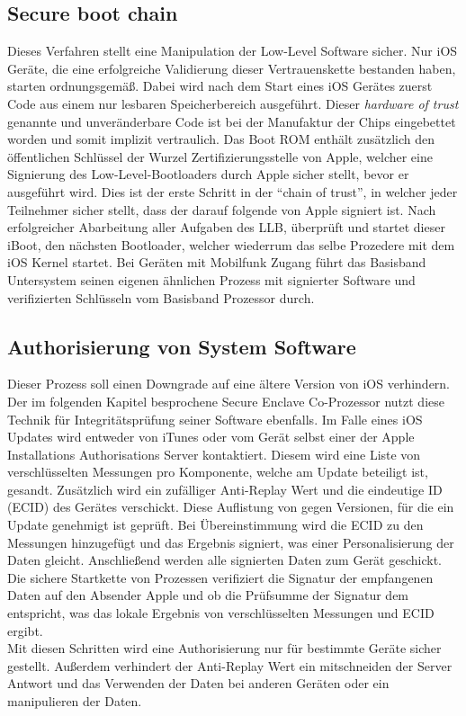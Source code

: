 	\subsection{Secure boot chain}
		Dieses Verfahren stellt eine Manipulation der Low-Level Software sicher. Nur
		iOS Geräte, die eine erfolgreiche Validierung dieser Vertrauenskette bestanden
		haben, starten ordnungsgemäß. Dabei wird nach dem Start eines iOS Gerätes
		zuerst Code aus einem nur lesbaren Speicherbereich ausgeführt. Dieser
		\textit{hardware of trust} genannte und unveränderbare Code ist bei der 
		Manufaktur der Chips eingebettet worden und somit implizit vertraulich. Das
		Boot ROM enthält zusätzlich den öffentlichen Schlüssel der Wurzel
		Zertifizierungsstelle von Apple, welcher eine Signierung des
		Low-Level-Bootloaders durch Apple sicher stellt, bevor er ausgeführt wird. 
		Dies ist der erste Schritt in der "`chain of trust"', in welcher jeder
		Teilnehmer sicher stellt, dass der darauf folgende von Apple signiert ist. 		
		Nach erfolgreicher Abarbeitung aller Aufgaben des LLB, überprüft und startet
		dieser iBoot, den nächsten Bootloader, welcher wiederrum das selbe Prozedere
		mit dem iOS Kernel startet. Bei Geräten mit Mobilfunk Zugang führt das
		Basisband Untersystem seinen eigenen ähnlichen Prozess mit signierter 
		Software und verifizierten Schlüsseln vom Basisband Prozessor durch.
		
	\subsection{Authorisierung von System Software}
		Dieser Prozess soll einen Downgrade auf eine ältere Version von iOS
		verhindern. Der im folgenden Kapitel besprochene Secure Enclave Co-Prozessor
		nutzt diese Technik für Integritätsprüfung seiner Software ebenfalls. Im Falle
		eines iOS Updates wird entweder von iTunes oder vom Gerät selbst einer der
		Apple Installations Authorisations Server kontaktiert. Diesem wird eine Liste
		von verschlüsselten Messungen pro Komponente, welche am Update
		beteiligt ist, gesandt. Zusätzlich wird ein	zufälliger Anti-Replay Wert und
		die eindeutige ID (ECID) des Gerätes verschickt. Diese Auflistung von gegen
		Versionen, für die ein Update genehmigt ist geprüft. Bei Übereinstimmung wird
		die ECID zu den Messungen hinzugefügt und das Ergebnis signiert, was einer
		Personalisierung der Daten gleicht.	Anschließend werden alle signierten Daten
		zum Gerät geschickt. Die sichere Startkette von Prozessen verifiziert die
		Signatur der empfangenen Daten auf den Absender Apple und ob die Prüfsumme der
		Signatur dem entspricht, was das lokale Ergebnis von verschlüsselten Messungen
		und ECID ergibt.\\
		Mit diesen Schritten wird eine Authorisierung nur für bestimmte Geräte sicher
		gestellt. Außerdem verhindert der Anti-Replay Wert ein mitschneiden der Server
		Antwort und das Verwenden der Daten bei anderen Geräten oder ein manipulieren
		der Daten.
